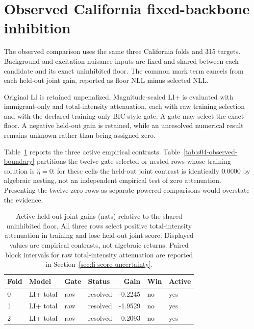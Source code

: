 \section{Observed California fixed-backbone inhibition}

\label{sec:s04-observed-completed}

The observed comparison uses the same three California folds and 315 targets. Background and excitation nuisance inputs are fixed and shared between each candidate and its exact uninhibited floor. The common mark term cancels from each held-out joint gain, reported as floor NLL minus selected NLL.

Original LI is retained unpenalized. Magnitude-scaled LI+ is evaluated with immigrant-only and total-intensity attenuation, each with raw training selection and with the declared training-only BIC-style gate. A gate may select the exact floor. A negative held-out gain is retained, while an unresolved numerical result remains unknown rather than being assigned zero.

Table~\ref{tab:s04-observed} reports the three active empirical contrasts. Table~\ref{tab:s04-observed-boundary} partitions the twelve gate-selected or nested rows whose training solution is $\hat\eta=0$: for these cells the held-out joint contrast is identically $0.0000$ by algebraic nesting, not an independent empirical test of zero attenuation. Presenting the twelve zero rows as separate powered comparisons would overstate the evidence.

\begin{table}[htbp]\centering\caption{Active held-out joint gains (nats) relative to the shared uninhibited floor. All three rows select positive total-intensity attenuation in training and lose held-out joint score. Displayed values are empirical contrasts, not algebraic returns. Paired block intervals for raw total-intensity attenuation are reported in Section~\ref{sec:li-score-uncertainty}.}\label{tab:s04-observed}

\begin{tabular}{llllrll}\toprule Fold & Model & Gate & Status & Gain & Win & Active\\\midrule

0 & LI+ total & raw & resolved & -0.2245 & no & yes \\

1 & LI+ total & raw & resolved & -1.9529 & no & yes \\

2 & LI+ total & raw & resolved & -0.2093 & no & yes \\

\bottomrule\end{tabular}\end{table}

